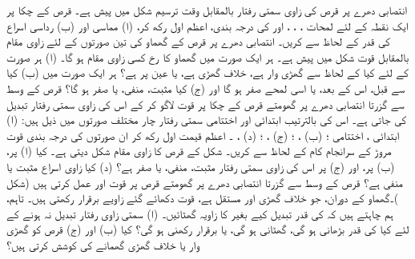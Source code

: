 انتصابی  دھرے  پر قرص  کی زاوی سمتی رفتار بالمقابل وقت  ترسیم شکل  میں پیش ہے۔ قرص کے چکا پر ایک   نقطہ  کے لئے  لمحات  ، ، ، اور  کی درجہ بندی، اعظم اول رکھ کر، (ا) مماسی اور (ب) رداسی اسراع کی قدر کے لحاظ سے کریں۔
انتصابی  دھرے  پر  قرص  کے گھماو کی تین صورتوں کے لئے زاوی مقام  بالمقابل قوت  شکل  میں پیش ہے۔ ہر ایک صورت میں گھماو کا رخ کسی زاوی مقام   ہو گا۔ (ا) ہر صورت کے لئے کیا    کے لحاظ سے     گھڑی وار ہے، خلاف گھڑی ہے، یا عین  پر ہے؟  ہر ایک صورت میں (ب) کیا     سے قبل، اس کے بعد، یا اسی لمحے  صفر ہو گا اور (ج) کیا   مثبت، منفی، یا صفر ہو گا؟
 قرص کے وسط سے گزرتا  انتصابی  دھرے  پر گھومتے  قرص کے چکا  پر قوت لاگو کر کے اس کی زاوی سمتی رفتار  تبدیل کی جاتی ہے۔ اس کی بالترتیب  ابتدائی اور اختتامی سمتی رفتار چار مختلف صورتوں میں ذیل ہیں:
 (ا) ابتدائی ، اختتامی ؛ 
 (ب)  ، ؛ 
 (ج)   ، ؛ 
 (د)   ، ۔
 اعظم قیمت اول رکھ کر ان صورتوں کی درجہ بندی  قوت مروڑ کے سرانجام کام کے لحاظ سے کریں۔
شکل  کے قرص کا زاوی مقام  شکل   دیتی ہے۔ کیا  (ا)  پر، (ب)     پر، اور (ج)   پر اس کی زاوی سمتی رفتار مثبت، منفی، یا صفر ہے؟ (د) کیا زاوی اسراع مثبت یا منفی ہے؟
 قرص کے وسط سے گزرتا انتصابی  دھرے  پر گھومتے قرص  پر قوت  اور  عمل کرتی ہیں (شکل )۔گھماو کے دوران، جو خلاف گھڑی  اور مستقل ہے،  قوت دکھائے گئے زاویے  برقرار رکھتی ہیں۔ تاہم، ہم چاہتے ہیں کہ  کی قدر تبدیل کیے بغیر  کا زاویہ   گھٹائیں۔ (ا)  سمتی زاوی رفتار تبدیل نہ ہونے کے لئے کیا   کی قدر بڑھانی ہو گی، گھٹانی ہو گی، یا  برقرار رکھنی ہو گی؟ کیا (ب)  اور (ج)  قرص کو گھڑی وار یا خلاف گھڑی گھمانے کی کوشش کرتی ہیں؟
